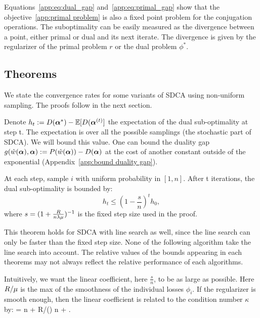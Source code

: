 \begin{subappendices}
	Equations~\eqref{app:eq:dual_gap} and~\eqref{app:eq:primal_gap} show that the objective~\eqref{app:primal problem} is also a fixed point problem for the conjugation operations.
	The suboptimality can be easily measured as the divergence between a point, either primal or dual and its next iterate.
	The divergence is given by the regularizer of the primal problem $r$ or the dual problem $\phi^*$.
	
	\subsection{Theorems}
	\label{app:theorem}
	
	We state the convergence rates for some variants of SDCA using non-uniform sampling. The proofs follow in the next section.
	
	Denote $h_t := D(\boldsymbol{\alpha}^*) - \operatorname{\mathbb{E}}[D(\boldsymbol{\alpha}^{(t)} ]$ the expectation of the dual sub-optimality at step t.
	The expectation is over all the possible samplings (the stochastic part of SDCA).
	We will bound this value.
	One can bound the duality gap $g(\hat w(\boldsymbol{\alpha}),\boldsymbol{\alpha}) := P(\hat w(\boldsymbol{\alpha})) - D(\boldsymbol{\alpha})$ at the cost of another constant outside of the exponential (Appendix~\ref{app:bound duality gap}).
	
	\begin{theorem}
		\label{app:th:uniform}
		At each step, sample $i$ with uniform probability in $[1,n]$.
		After t iterations, the dual sub-optimality is bounded by:
		\begin{equation}
			h_t \leq (1-\frac{s}{n})^t  h_0,
		\end{equation}
		where $ s = (1+ \frac{R}{n \lambda \mu} )^{-1} $ is the fixed step size used in the proof.
	\end{theorem}
	
	This theorem holds for SDCA with line search as well, since the line search can only be faster than the fixed step size.
	None of the following algorithm take the line search into account.
	The relative values of the bounds appearing in each theorems may not always reflect the relative
	performance of each algorithms.
	
	Intuitively, we want the linear coefficient, here $\frac{s}{n}$, to be as large as possible.
	Here $R/\mu$ is the max of the smoothness of the individual losses $\phi_i$.
	If the regularizer is smooth enough, then the linear coefficient is related to the condition number $\kappa$ by:
	\beq
	  = n + R/(\lambda \strgconvex) \approx n + \kappa.
	\eeq
	

\end{subappendices}
